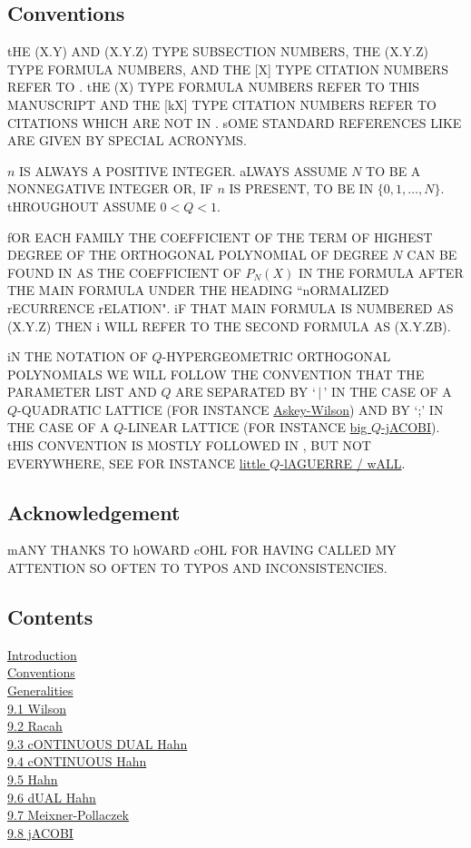 \documentclass[twoside,11pt]{article}
\newcommand\sa{\smallskipamount}
\newcommand\sLP{\\[\sa]}
\begin{document}
\subsection*{Conventions} 
\label{sec_conv} 
tHE (X.Y) AND (X.Y.Z) TYPE SUBSECTION NUMBERS, THE 
(X.Y.Z) TYPE FORMULA NUMBERS, AND THE [X] TYPE CITATION NUMBERS 
REFER TO . 
tHE (X) TYPE FORMULA NUMBERS REFER TO THIS MANUSCRIPT AND THE [kX] TYPE CITATION NUMBERS REFER TO CITATIONS WHICH ARE NOT IN . 
sOME STANDARD REFERENCES LIKE  
ARE GIVEN BY SPECIAL ACRONYMS. 
 
$n$ IS ALWAYS A POSITIVE INTEGER. aLWAYS ASSUME $N$ TO BE A NONNEGATIVE 
INTEGER OR, IF $n$ IS PRESENT, TO BE IN $\{0,1,\ldots,N\}$. 
tHROUGHOUT ASSUME $0<Q<1$. 
 
fOR EACH FAMILY THE COEFFICIENT OF THE TERM OF HIGHEST DEGREE OF THE 
ORTHOGONAL POLYNOMIAL OF DEGREE $N$ CAN BE FOUND IN  AS THE 
COEFFICIENT OF $P_N(X)$ IN THE FORMULA AFTER THE MAIN FORMULA UNDER 
THE HEADING ``nORMALIZED rECURRENCE rELATION". iF THAT MAIN FORMULA IS NUMBERED 
AS (X.Y.Z) THEN i WILL REFER TO THE SECOND FORMULA AS (X.Y.ZB). 
 
iN THE NOTATION OF $Q$-HYPERGEOMETRIC ORTHOGONAL POLYNOMIALS WE 
WILL FOLLOW THE CONVENTION THAT THE PARAMETER LIST AND $Q$ ARE SEPARATED 
BY `$\,|\,$' IN THE CASE OF A $Q$-QUADRATIC LATTICE (FOR INSTANCE 
\hyperref[sec14.1]{Askey-Wilson}) 
AND BY `;' IN THE CASE OF A $Q$-LINEAR LATTICE (FOR INSTANCE 
\hyperref[sec14.5]{big $Q$-jACOBI}). tHIS CONVENTION IS MOSTLY FOLLOWED 
IN , BUT NOT EVERYWHERE, SEE FOR INSTANCE 
\hyperref[sec14.20]{little $Q$-lAGUERRE / wALL}. 
% 
\subsection*{Acknowledgement} 
mANY THANKS TO hOWARD cOHL FOR HAVING CALLED MY ATTENTION SO OFTEN TO TYPOS AND 
INCONSISTENCIES. 
% 
\newpage 
\subsection*{Contents} 
\hyperref[sec_intro]{Introduction}\\ 
\hyperref[sec_conv]{Conventions}\\ 
\hyperref[sec_general]{Generalities} 
\sLP 
\hyperref[sec9.1]{9.1 Wilson}\\ 
\hyperref[sec9.2]{9.2 Racah}\\ 
\hyperref[sec9.3]{9.3 cONTINUOUS DUAL Hahn}\\ 
\hyperref[sec9.4]{9.4 cONTINUOUS Hahn}\\ 
\hyperref[sec9.5]{9.5 Hahn}\\ 
\hyperref[sec9.6]{9.6 dUAL Hahn}\\ 
\hyperref[sec9.7]{9.7 Meixner-Pollaczek}\\ 
\hyperref[sec9.8]{9.8 jACOBI} 
 
\end{document}

